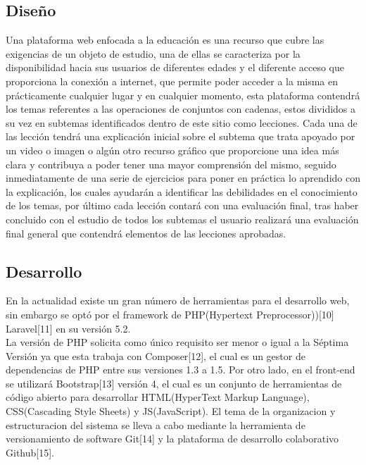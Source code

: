 \documentclass{llncs}
\begin{document}
\subsection{Diseño}
Una plataforma web enfocada a la educación es una recurso que cubre las exigencias de un objeto de estudio, una de ellas se caracteriza por la disponibilidad hacia sus usuarios de diferentes edades y el diferente acceso que proporciona la conexión a internet, que permite poder acceder a la misma en prácticamente cualquier lugar y en cualquier momento, esta plataforma contendrá los temas referentes a las operaciones de conjuntos con cadenas, estos divididos a su vez en subtemas identificados dentro de este sitio como lecciones. Cada una de las lección tendrá una explicación inicial sobre el subtema que trata apoyado por un video o imagen o algún otro recurso gráfico que proporcione una idea más clara y contribuya a poder tener una mayor comprensión del mismo, seguido inmediatamente de una serie de ejercicios para poner en práctica lo aprendido con la explicación, los cuales ayudarán a identificar las debilidades en el conocimiento de los temas, por último cada lección contará con una evaluación final, tras haber concluido con el estudio de todos los subtemas el usuario realizará una evaluación final general que contendrá elementos de las lecciones aprobadas.


\subsection{Desarrollo}
En la actualidad existe un gran número de herramientas para el desarrollo web, sin embargo se optó por el framework de PHP(Hypertext Preprocessor))[10] Laravel[11] en su versión 5.2. \\
La versión de PHP solicita como único requisito ser menor o igual a la Séptima Versión ya que esta trabaja con Composer[12], el cual es un gestor de dependencias de PHP entre sus versiones 1.3 a 1.5. Por otro lado, en el front-end se utilizará Bootstrap[13] versión 4, el cual es un conjunto de herramientas de código abierto para desarrollar HTML(HyperText Markup Language), CSS(Cascading Style Sheets) y JS(JavaScript). El tema de la organizacion y estructuracion del sistema se lleva a cabo mediante la herramienta de versionamiento de software Git[14] y la plataforma de desarrollo colaborativo Github[15].


%
\end{document}
